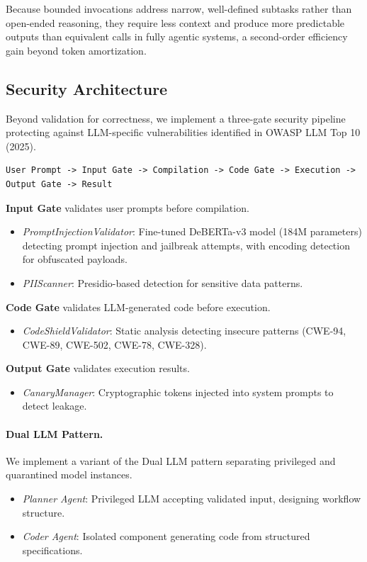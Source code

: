 \documentclass[11pt]{article}
\begin{document}
Because bounded invocations address narrow, well-defined subtasks rather than open-ended reasoning, they require less context and produce more predictable outputs than equivalent calls in fully agentic systems, a second-order efficiency gain beyond token amortization.

\subsection{Security Architecture}
\label{sec:security-arch}

Beyond validation for correctness, we implement a three-gate security pipeline protecting against LLM-specific vulnerabilities identified in OWASP LLM Top 10 (2025).

\begin{verbatim}
User Prompt -> Input Gate -> Compilation -> Code Gate -> Execution -> Output Gate -> Result
\end{verbatim}

\textbf{Input Gate} validates user prompts before compilation.
\begin{itemize}
    \item \textit{PromptInjectionValidator}: Fine-tuned DeBERTa-v3 model (184M parameters) detecting prompt injection and jailbreak attempts, with encoding detection for obfuscated payloads.
    \item \textit{PIIScanner}: Presidio-based detection for sensitive data patterns.
\end{itemize}

\textbf{Code Gate} validates LLM-generated code before execution.
\begin{itemize}
    \item \textit{CodeShieldValidator}: Static analysis detecting insecure patterns (CWE-94, CWE-89, CWE-502, CWE-78, CWE-328).
\end{itemize}

\textbf{Output Gate} validates execution results.
\begin{itemize}
    \item \textit{CanaryManager}: Cryptographic tokens injected into system prompts to detect leakage.
\end{itemize}

\paragraph{Dual LLM Pattern.} We implement a variant of the Dual LLM pattern separating privileged and quarantined model instances.
\begin{itemize}
    \item \textit{Planner Agent}: Privileged LLM accepting validated input, designing workflow structure.
    \item \textit{Coder Agent}: Isolated component generating code from structured specifications.
\end{itemize}
\end{document}
